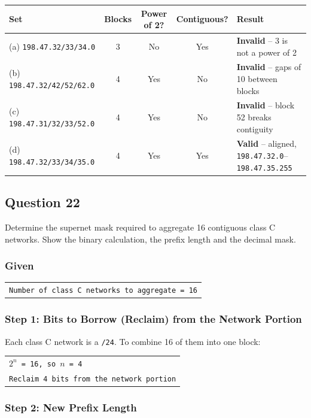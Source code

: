 \documentclass[11pt,a4paper]{article}
\begin{document}
\begin{tabularx}{\textwidth}{@{}lcccX@{}}
\toprule
\rowcolor{tablehead}\textbf{Set} & \textbf{Blocks} & \textbf{Power of 2?} & \textbf{Contiguous?} & \textbf{Result} \\
\midrule
(a) \texttt{198.47.32/33/34.0} & 3 & No & Yes & \textbf{Invalid} -- 3 is not a power of 2 \\
(b) \texttt{198.47.32/42/52/62.0} & 4 & Yes & No & \textbf{Invalid} -- gaps of 10 between blocks \\
(c) \texttt{198.47.31/32/33/52.0} & 4 & Yes & No & \textbf{Invalid} -- block 52 breaks contiguity \\
(d) \texttt{198.47.32/33/34/35.0} & 4 & Yes & Yes & \textbf{Valid} -- aligned, \texttt{198.47.32.0}--\texttt{198.47.35.255} \\
\bottomrule
\end{tabularx}

\subsection*{Question 22}

Determine the supernet mask required to aggregate 16 contiguous class C networks. Show the
binary calculation, the prefix length and the decimal mask.

\subsubsection*{Given}

\begin{tabularx}{\textwidth}{@{}X@{}}
\texttt{Number of class C networks to aggregate = 16} \\
\end{tabularx}

\subsubsection*{Step 1: Bits to Borrow (Reclaim) from the Network Portion}

Each class C network is a \texttt{/24}. To combine 16 of them into one block:

\begin{tabularx}{\textwidth}{@{}X@{}}
\texttt{$2^{n}$ = 16, so $n$ = 4} \\
\texttt{Reclaim 4 bits from the network portion} \\
\end{tabularx}

\subsubsection*{Step 2: New Prefix Length}
\end{document}
